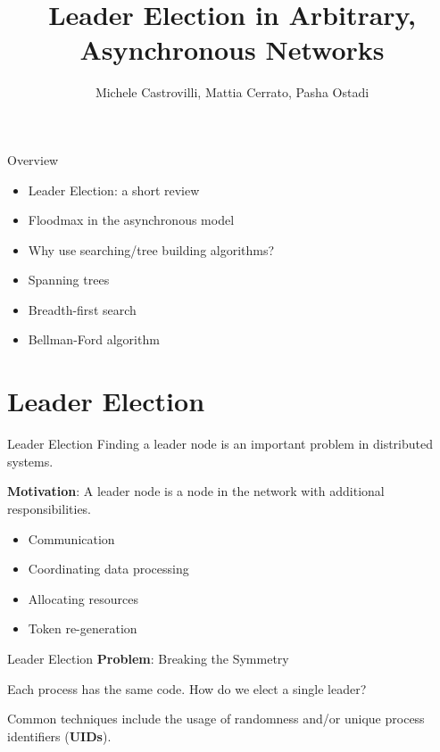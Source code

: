 \documentclass[pdf]{beamer}
\title{Leader Election in Arbitrary, Asynchronous Networks}
\author{Michele Castrovilli, Mattia Cerrato, Pasha Ostadi}
\begin{document}
\Large
\begin{frame}
    \maketitle
\end{frame}

\normalsize
\begin{frame}{Overview}
    \begin{itemize}
        \item Leader Election: a short review
        \item Floodmax in the asynchronous model
        \item Why use searching/tree building algorithms?
        \item Spanning trees
        \item Breadth-first search
        \item Bellman-Ford algorithm 
    \end{itemize}
\end{frame}

\section{Leader Election}
\begin{frame}{Leader Election}
    Finding a leader node is an important problem in distributed systems.
    
    \vspace{12pt}
    \textbf{Motivation}: A leader node is a node in the network with additional responsibilities.
    \begin{itemize}
        \item Communication
        \item Coordinating data processing
        \item Allocating resources
        \item Token re-generation
   \end{itemize} 
\end{frame}

\begin{frame}{Leader Election}
    \textbf{Problem}: Breaking the Symmetry 
    
    \vspace{12pt}
    Each process has the same code. How do we elect a single leader?
    
    \vspace{12pt}
    Common techniques include the usage of randomness and/or unique process identifiers (\textbf{UIDs}).
\end{frame}
\end{document}
